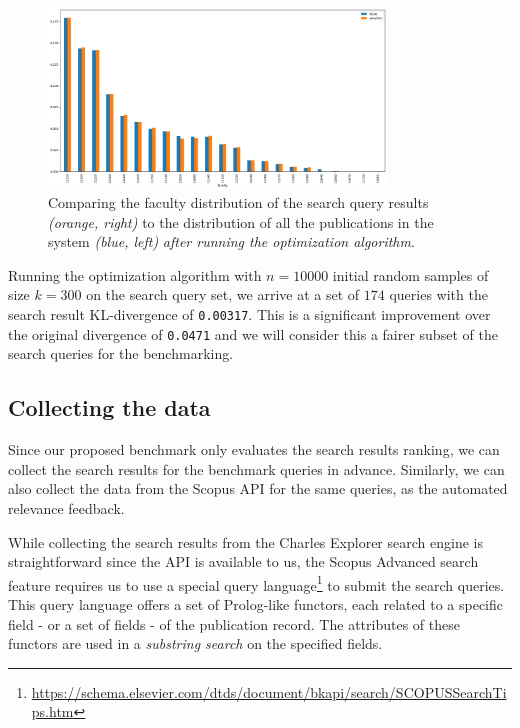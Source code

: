 \begin{figure}[ht!]
    \captionsetup{width=.9\linewidth}
    \includegraphics[width=0.8\textwidth]{../img/all-queries-vs-totals-corrected.png}
    \centering
    \caption{Comparing the faculty distribution of the search query results \textit{(orange, right)} to the distribution of all the publications in the system \textit{(blue, left)} \textit{after running the optimization algorithm}.}
\end{figure}

Running the optimization algorithm with $n = 10000$ initial random samples of size $k = 300$ on the search query set, we arrive at a set of $174$ queries with the search result KL-divergence of \texttt{0.00317}. 
This is a significant improvement over the original divergence of \texttt{0.0471} and we will consider this a fairer subset of the search queries for the benchmarking.

\subsection{Collecting the data}

Since our proposed benchmark only evaluates the search results ranking, we can collect the search results for the benchmark queries in advance.
Similarly, we can also collect the data from the Scopus API for the same queries, as the automated relevance feedback.

While collecting the search results from the Charles Explorer search engine is straightforward since the API is available to us, 
the Scopus Advanced search feature requires us to use a special query language\footnote{\url{https://schema.elsevier.com/dtds/document/bkapi/search/SCOPUSSearchTips.htm}} to submit the search queries. 
This query language offers a set of Prolog-like functors, 
each related to a specific field - or a set of fields - of the publication record. 
The attributes of these functors are used in a \textit{substring search} on the specified fields.


